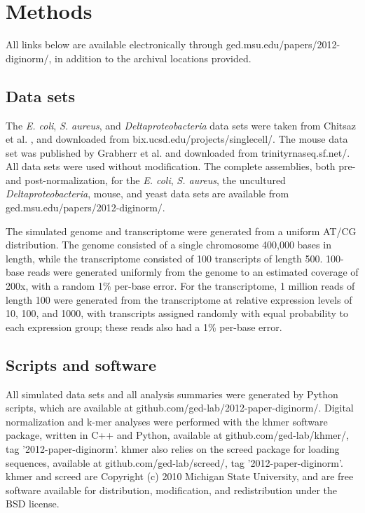 
\section{Methods}

All links below are available electronically through
ged.msu.edu/papers/2012-diginorm/, in addition to the
archival locations provided.

\subsection{Data sets}

The {\em E. coli}, {\em S. aureus}, and {\em Deltaproteobacteria} data
sets were taken from Chitsaz et al. \cite{pubmed21926975}, and
downloaded from bix.ucsd.edu/projects/singlecell/.  The
mouse data set was published by Grabherr et al. \cite{pubmed21572440}
and downloaded from trinityrnaseq.sf.net/.  All data sets
were used without modification.
The complete assemblies, both pre- and post-normalization, for the
{\em E. coli}, {\em S. aureus}, the uncultured {\em
  Deltaproteobacteria}, mouse, and yeast data sets are available from
ged.msu.edu/papers/2012-diginorm/.

The simulated genome and transcriptome were generated from a uniform
AT/CG distribution.  The genome consisted of a single chromosome
400,000 bases in length, while the transcriptome consisted of 100
transcripts of length 500.  100-base reads were generated uniformly
from the genome to an estimated coverage of 200x, with a random 1\%
per-base error.  For the transcriptome, 1 million reads of length 100
were generated from the transcriptome at relative expression levels of
10, 100, and 1000, with transcripts assigned randomly with equal
probability to each expression group; these reads also had a 1\%
per-base error.

\subsection{Scripts and software}

All simulated data sets and all analysis summaries were generated by
Python scripts, which are available at
github.com/ged-lab/2012-paper-diginorm/.  Digital normalization and k-mer
analyses were performed with the khmer software package, written in
C++ and Python, available at github.com/ged-lab/khmer/, tag
'2012-paper-diginorm'.  khmer also relies on the screed package for
loading sequences, available at github.com/ged-lab/screed/, tag
'2012-paper-diginorm'.  khmer and screed are Copyright (c) 2010
Michigan State University, and are free software available for
distribution, modification, and redistribution under the BSD license.


